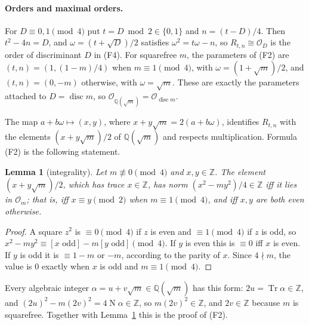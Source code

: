 \documentclass[11pt]{article}
\newtheorem{lemma}[theorem]{Lemma}
\theoremstyle{definition}
\theoremstyle{remark}
\newcommand{\Q}{\mathbb{Q}}
\newcommand{\Z}{\mathbb{Z}}
\newcommand{\OO}{\mathcal{O}}
\newcommand{\disc}{\operatorname{disc}}
\newcommand{\Tr}{\operatorname{Tr}}
\newcommand{\Nm}{\operatorname{N}}
\begin{document}
\paragraph{Orders and maximal orders.}
For $D\equiv0,1\pmod4$ put $t=D\bmod 2\in\{0,1\}$ and $n=(t-D)/4$. Then $t^2-4n=D$, and
$\omega=(t+\sqrt D)/2$ satisfies $\omega^2=t\omega-n$, so $R_{t,n}\cong\OO_D$ is the order of
discriminant $D$ in (F4). For squarefree $m$, the parameters of (F2) are $(t,n)=(1,(1-m)/4)$ when
$m\equiv1\pmod4$, with $\omega=(1+\sqrt m)/2$, and $(t,n)=(0,-m)$ otherwise, with $\omega=\sqrt m$.
These are exactly the parameters attached to $D=\disc m$, so $\OO_{\Q(\sqrt m)}=\OO_{\disc m}$.

The map $a+b\omega\mapsto(x,y)$, where $x+y\sqrt m=2(a+b\omega)$, identifies $R_{t,n}$ with the
elements $(x+y\sqrt m)/2$ of $\Q(\sqrt m)$ and respects multiplication. Formula (F2) is the
following statement.

\begin{lemma}[integrality]\label{lem:integral}
Let $m\not\equiv0\pmod4$ and $x,y\in\Z$. The element $(x+y\sqrt m)/2$, which has trace
$x\in\Z$, has norm $(x^2-my^2)/4\in\Z$ iff it lies in $\OO_m$; that is, iff $x\equiv y\pmod2$
when $m\equiv1\pmod4$, and iff $x,y$ are both even otherwise.
\end{lemma}
\begin{proof}
A square $z^2$ is $\equiv0\pmod4$ if $z$ is even and $\equiv1\pmod4$ if $z$ is odd, so $x^2-my^2\equiv[x\text{ odd}]-m[y\text{ odd}]\pmod 4$.
If $y$ is even this is $\equiv0$ iff $x$ is even. If $y$ is odd it is $\equiv 1-m$ or $-m$,
according to the parity of $x$. Since $4\nmid m$, the value is $0$ exactly when $x$ is odd and
$m\equiv1\pmod4$.
\end{proof}
Every algebraic integer $\alpha=u+v\sqrt m\in\Q(\sqrt m)$ has this form: $2u=\Tr\alpha\in\Z$, and
$(2u)^2-m(2v)^2=4\Nm\alpha\in\Z$, so $m(2v)^2\in\Z$, and $2v\in\Z$ because $m$ is squarefree.
Together with Lemma~\ref{lem:integral} this is the proof of (F2).
\end{document}

